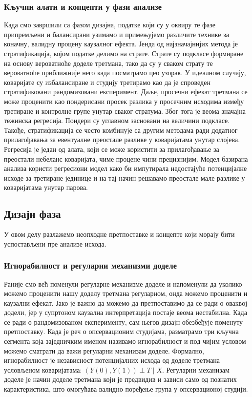 \documentclass[12pt, a4paper]{article}
\begin{document}
\subsubsection{Кључни алати и концепти у фази анализе}
Када смо завршили са фазом дизајна, податке који су у оквиру те фазе припремљени и балансирани узимамо и примењујемо различите технике за коначну, валидну процену каузалног ефекта. Јенда од најзначајнијих метода је стратификација, којом податке делимо на страте. Страте су подкласе формиране на основу вероватноће доделе третмана, тако да су у сваком страту те вероватноће приближније него када посматрамо цео узорак. У идеалном случају, коваријате су избалансиране и студију  третирамо као да је спроведен стратификовани рандомизовани експеримент. Даље, просечни ефекат третмана се може проценити као пондерисани просек разлика у просечним исходима између третиране и контролне групе унутар сваког стратума. Због тога је веома значајна тежинска регресија. Пондери су углавном засновани на величини подкласе. Такође, стратификација се често комбинује са другим методама ради додатног прилагођавања за евентуалне преостале разлике у коваријатама унутар слојева. Регресија је један од алата, који се може користити за прилагођавање за преостали небеланс коваријата, чиме процене чини прецизнијим. Модел базирана анализа користи регресиони модел како би импутирала недостајуће потенцијалне исходе за третиране јединице и на тај начин решавамо преостале мале разлике у коваријатама унутар парова.
\subsection{Дизајн фаза}
У овом делу разлажемо неопходне претпоставке и концепте који морају бити успостављени пре анализе исхода. 
\subsubsection{Игнорабилност и регуларни механизми доделе}
Раније смо већ поменули регуларне механизме доделе и напоменули да уколико можемо проценити нашу доделу третмана регуларном, онда можемо проценити и каузални ефекат. Јако је важно да можемо да претпоставимо да се ради о оваквој додели, јер у супртоном каузална интерпретација постаје веома нестабилна. Када се ради о рандомизованом експерименту, сам његов дизајн обезбеђује поменуту претпоставку. Када је реч о опсервационим студијама, разматрамо три кључна сегмента која заједничким именом називамо игнорабилност и под чијим условом можемо сматрати да важи регуларни механизам доделе. 
Формално, игнорабилност је независност потенцијалних исхода од доделе третмана условљеном коваријатама: $(Y(0), Y(1)) \perp T \mid X$. Регуларни механизам доделе је начин доделе третмана који је предвидив и зависи само од познатих карактеристика, што омогућава валидно поређење група у опсервационој студији.
\end{document}
